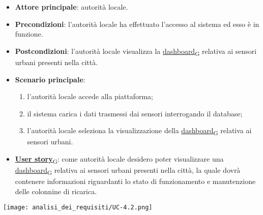 \begin{itemize}
	\item \textbf{Attore principale}: autorità locale.
	\item \textbf{Precondizioni}: l'autorità locale ha effettuato l'accesso al sistema ed esso è in funzione.
	\item \textbf{Postcondizioni}: l'autorità locale visualizza la \href{https://7last.github.io/docs/pb/documentazione-interna/glossario\#dashboard}{dashboard\textsubscript{G}} relativa
	      ai sensori urbani presenti nella città.
	\item \textbf{Scenario principale}:
	      \begin{enumerate}
		      \item l'autorità locale accede alla piattaforma;
		      \item il sistema carica i dati trasmessi dai sensori interrogando il database;
		      \item l'autorità locale seleziona la visualizzazione della \href{https://7last.github.io/docs/pb/documentazione-interna/glossario\#dashboard}{dashboard\textsubscript{G}} relativa ai sensori urbani.
	      \end{enumerate}
	\item \href{https://7last.github.io/docs/pb/documentazione-interna/glossario\#user-story}{\textbf{User story}\textsubscript{G}}:
	      come autorità locale desidero poter visualizzare una \href{https://7last.github.io/docs/pb/documentazione-interna/glossario\#dashboard}{dashboard\textsubscript{G}} relativa ai sensori urbani presenti nella città, la quale
	      dovrà contenere informazioni riguardanti lo stato di funzionamento e manutenzione delle colonnine di ricarica.
\end{itemize}
\begin{center}
	\texttt{[image: analisi\_dei\_requisiti/UC-4.2.png]}
\end{center}


